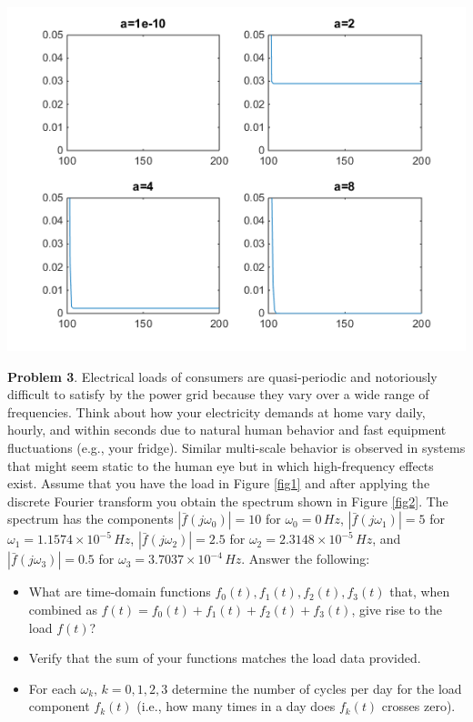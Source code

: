 \documentclass[10pt]{article}
\begin{document}
\includegraphics{CBE660_Assign8_2_Fig1.png} \\





\newpage

\noindent\colorbox{mygray}{\begin{minipage}{\textwidth}
  {\bf Problem 3}.  Electrical loads of consumers are quasi-periodic and notoriously difficult to satisfy by the power grid because they vary over a wide range of frequencies. Think about how your electricity demands at home vary daily, hourly, and within seconds due to natural human behavior and fast equipment fluctuations (e.g., your fridge). Similar multi-scale behavior is observed in systems that might seem static to the human eye but in which high-frequency effects exist.  Assume that you have the load in Figure \ref{fig1} and after applying the discrete Fourier transform you obtain the spectrum shown in Figure \ref{fig2}. The spectrum has the components $|\bar{f}(j\omega_0)|=10$ for $\omega_0=0\,Hz$, $|\bar{f}(j\omega_1)|=5$ for $\omega_1=1.1574\times 10^{-5}\,Hz$, $|\bar{f}(j\omega_2)|=2.5$ for $\omega_2=2.3148\times 10^{-5}\,Hz$, and $|\bar{f}(j\omega_3)|=0.5$ for $\omega_3=3.7037\times 10^{-4}\, Hz$.  Answer the following:
  
  \begin{itemize}
  \item What are time-domain functions $f_0(t),f_1(t),f_2(t),f_3(t)$ that, when combined as $f(t)=f_0(t)+f_1(t)+f_2(t)+f_3(t)$, give rise to the load $f(t)$? 
  \item Verify that the sum of your functions matches the load data provided.
  \item For each $\omega_k,\, k=0,1,2,3$ determine the number of cycles per day for the load component $f_k(t)$ (i.e., how many times in a day does $f_k(t)$ crosses zero). 
  \end{itemize}
  \end{minipage}}
\\
\end{document}
